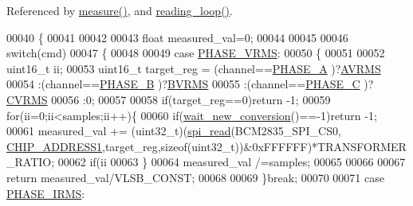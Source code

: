 Referenced by \hyperlink{a00041_source_l00040}{measure()}, and \hyperlink{a00034_source_l00302}{reading\-\_\-loop()}.


\begin{DoxyCode}
00040                                                         \{
00041 
00042 
00043     \textcolor{keywordtype}{float} measured\_val=0;
00044 
00045 
00046          \textcolor{keywordflow}{switch}(cmd)
00047         \{
00048            
00049                 \textcolor{keywordflow}{case}  \hyperlink{a00042_af0c09c5a455410e6fbd35fd55221338f}{PHASE\_VRMS}:
00050                 \{
00051                                 
00052                     uint16\_t ii;
00053                     uint16\_t target\_reg =  (channel==\hyperlink{a00042_ad214039f52b011ce2bd6c85ff98a981b}{PHASE\_A} )?\hyperlink{a00035_ae4c7fedd5702010e6907a686a35c1fa8}{AVRMS}
00054                                           :(channel==\hyperlink{a00042_ad7b96feed1e1c12515dad5e926b2c62e}{PHASE\_B} )?\hyperlink{a00035_a09f7027a92ccae6bb9b5738d5bc185f3}{BVRMS}
00055                                           :(channel==\hyperlink{a00042_a3ceb83fb10c2af19b468d508448f24e2}{PHASE\_C} )?\hyperlink{a00035_a61e9291ce0829a45cee1ee9a5f3ea4f7}{CVRMS}
00056                                           :0;                               
00057                     
00058                     \textcolor{keywordflow}{if}(target\_reg==0)\textcolor{keywordflow}{return} -1;                         
00059                     \textcolor{keywordflow}{for}(ii=0;ii<samples;ii++)\{
00060                     \textcolor{keywordflow}{if}(\hyperlink{a00002_ga7b6d584350762c53419945480d6958d3}{wait\_new\_conversion}()==-1)\textcolor{keywordflow}{return} -1;
00061                     measured\_val += (uint32\_t)(\hyperlink{a00006_ga7ad9f65ee46aca507374096506a0b1c4}{spi\_read}(BCM2835\_SPI\_CS0,
      \hyperlink{a00036_a94de2b046db6e10257ef4481c0a15eaa}{CHIP\_ADDRESS1},target\_reg,\textcolor{keyword}{sizeof}(uint32\_t))&0xFFFFFF)*TRANSFORMER\_RATIO; 
00062                     \textcolor{keywordflow}{if}(ii%
00063                     \}
00064                     measured\_val /=samples;
00065                     
00066             
00067                     \textcolor{keywordflow}{return} measured\_val/VLSB\_CONST;
00068                 
00069                 \}\textcolor{keywordflow}{break};
00070 
00071                 \textcolor{keywordflow}{case}  \hyperlink{a00042_a15c9ccf287820001431c33c4bb25a23b}{PHASE\_IRMS}:

\end{DoxyCode}
